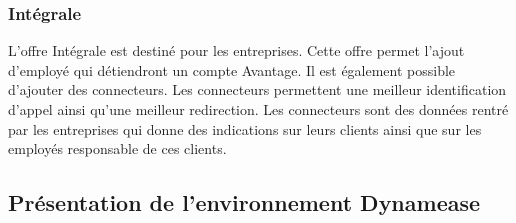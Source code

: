 \subsubsection{Intégrale}

L'offre Intégrale est destiné pour les entreprises. Cette offre permet l'ajout d'employé qui détiendront un compte Avantage. Il est également possible d'ajouter des connecteurs. Les connecteurs permettent une meilleur identification d'appel ainsi qu'une meilleur redirection. Les connecteurs sont des données rentré par les entreprises qui donne des indications sur leurs clients ainsi que sur les employés responsable de ces clients.

\subsection{Présentation de l'environnement Dynamease}